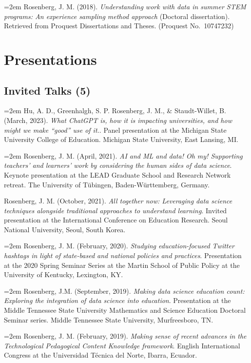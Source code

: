 \documentclass[
  14,
]{article}
\begin{document}
\hangindent=2em Rosenberg, J. M. (2018). \emph{Understanding work with
data in summer STEM programs: An experience sampling method approach}
(Doctoral dissertation). Retrieved from Proquest Dissertations and
Theses. (Proquest No.~10747232)

\hypertarget{presentations}{%
\section{Presentations}\label{presentations}}

\hypertarget{invited-talks-5}{%
\subsection{Invited Talks (5)}\label{invited-talks-5}}

\hangindent=2em Hu, A. D., Greenhalgh, S. P. Rosenberg, J. M., \&
Staudt-Willet, B. (March, 2023). \emph{What ChatGPT is, how it is
impacting universities, and how might we make ``good'' use of it.}.
Panel presentation at the Michigan State University College of
Education. Michigan State University, East Lansing, MI.

\hangindent=2em Rosenberg, J. M. (April, 2021). \emph{AI and ML and
data! Oh my! Supporting teachers' and learners' work by considering the
human sides of data science}. Keynote presentation at the LEAD Graduate
School and Research Network retreat. The University of Tübingen,
Baden-Württemberg, Germany.

Rosenberg, J. M. (October, 2021). \emph{All together now: Leveraging
data science techniques alongside traditional approaches to understand
learning}. Invited presentation at the International Conference on
Education Research. Seoul National University, Seoul, South Korea.

\hangindent=2em Rosenberg, J. M. (February, 2020). \emph{Studying
education-focused Twitter hashtags in light of state-based and national
policies and practices}. Presentation at the 2020 Spring Seminar Series
at the Martin School of Public Policy at the University of Kentucky,
Lexington, KY.

\hangindent=2em Rosenberg, J.M. (September, 2019). \emph{Making data
science education count: Exploring the integration of data science into
education}. Presentation at the Middle Tennessee State University
Mathematics and Science Education Doctoral Seminar series. Middle
Tennessee State University, Murfreesboro, TN.

\hangindent=2em Rosenberg, J. M. (February, 2019). \emph{Making sense of
recent advances in the Technological Pedagogical Content Knowledge
framework}. English International Congress at the Universidad Técnica
del Norte, Ibarra, Ecuador.
\end{document}
